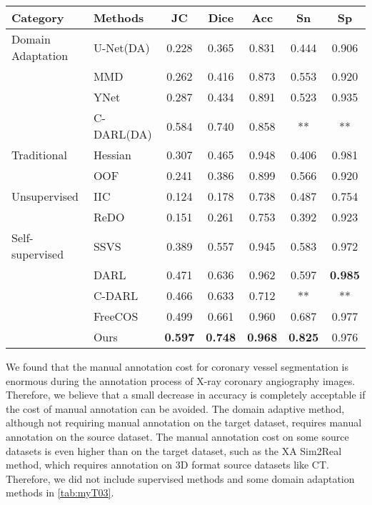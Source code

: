 \begin{table*}[h]
    \centering
    \caption{Quantitative evaluation of Our Method compared with different methods on the XCAD dataset}
    \label{tab:quantitative}
    \begin{tabular}{llccccc}
    \toprule
    \textbf{Category} & \textbf{Methods} & \textbf{JC} & \textbf{Dice} & \textbf{Acc} & \textbf{Sn} & \textbf{Sp} \\
    \midrule
    
    \multirow{}{}{Domain Adaptation} 
    & U-Net(DA) & 0.228 & 0.365 & 0.831 & 0.444 & 0.906 \\
    & MMD & 0.262 & 0.416 & 0.873 & 0.553 & 0.920 \\
    & YNet & 0.287 & 0.434 & 0.891 & 0.523 & 0.935 \\
    & C-DARL(DA) & 0.584 & 0.740 & 0.858 & ** & ** \\
    
    \midrule
    
    \multirow{}{}{Traditional} 
    & Hessian & 0.307 & 0.465 & 0.948 & 0.406 & 0.981 \\
    & OOF & 0.241 & 0.386 & 0.899 & 0.566 & 0.920 \\
    
    \midrule
    
    \multirow{}{}{Unsupervised} 
    & IIC & 0.124 & 0.178 & 0.738 & 0.487 & 0.754 \\
    & ReDO & 0.151 & 0.261 & 0.753 & 0.392 & 0.923 \\
    
    \midrule
    
    \multirow{}{}{Self-supervised} 
    & SSVS & 0.389 & 0.557 & 0.945 & 0.583 & 0.972 \\
    & DARL & 0.471 & 0.636 & 0.962 & 0.597 & \textbf{0.985} \\
    & C-DARL & 0.466 & 0.633 & 0.712 & ** & ** \\
    & FreeCOS & 0.499 & 0.661 & 0.960 & 0.687 & 0.977 \\
    & Ours & \textbf{0.597} & \textbf{0.748} & \textbf{0.968} & \textbf{0.825} & 0.976 \\
    
    \bottomrule
    \end{tabular}
    \label{tab:myT03}
\end{table*}

We found that the manual annotation cost for coronary vessel segmentation is enormous during the annotation process of X-ray coronary angiography images. Therefore, we believe that a small decrease in accuracy is completely acceptable if the cost of manual annotation can be avoided. The domain adaptive method, although not requiring manual annotation on the target dataset, requires manual annotation on the source dataset. 
The manual annotation cost on some source datasets is even higher than on the target dataset, 
such as the XA Sim2Real \cite{00.01.XA-Sim2Real} method, 
which requires annotation on 3D format source datasets like CT. 
Therefore, we did not include supervised methods and some domain adaptation methods in \cref{tab:myT03}.

